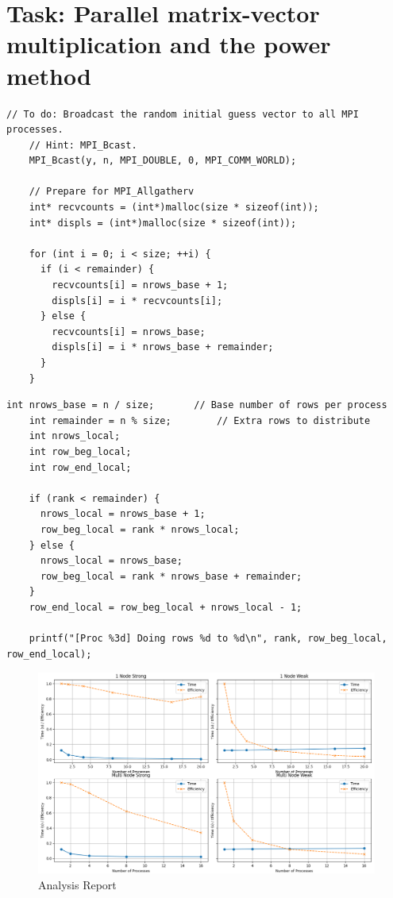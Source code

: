 \documentclass[unicode,11pt,a4paper,oneside,numbers=endperiod,openany]{scrartcl}
\begin{document}
\section{Task: Parallel matrix-vector multiplication and the power method}
\begin{lstlisting}[style=mystyle, language=MyC++, caption={Broadcasting and Preparing for MPI\_Allgatherv}]
    // To do: Broadcast the random initial guess vector to all MPI processes.
    // Hint: MPI_Bcast.
    MPI_Bcast(y, n, MPI_DOUBLE, 0, MPI_COMM_WORLD);
  
    // Prepare for MPI_Allgatherv
    int* recvcounts = (int*)malloc(size * sizeof(int));
    int* displs = (int*)malloc(size * sizeof(int));
  
    for (int i = 0; i < size; ++i) {
      if (i < remainder) {
        recvcounts[i] = nrows_base + 1;
        displs[i] = i * recvcounts[i];
      } else {
        recvcounts[i] = nrows_base;
        displs[i] = i * nrows_base + remainder;
      }
    }
\end{lstlisting}
\newpage
\begin{lstlisting}[style=mystyle, language=MyC++, caption={Determining Local Row Ranges for MPI Processes}]
    int nrows_base = n / size;       // Base number of rows per process
    int remainder = n % size;        // Extra rows to distribute
    int nrows_local;
    int row_beg_local;
    int row_end_local;
  
    if (rank < remainder) {
      nrows_local = nrows_base + 1;
      row_beg_local = rank * nrows_local;
    } else {
      nrows_local = nrows_base;
      row_beg_local = rank * nrows_base + remainder;
    }
    row_end_local = row_beg_local + nrows_local - 1;
  
    printf("[Proc %3d] Doing rows %d to %d\n", rank, row_beg_local, row_end_local);
\end{lstlisting}
  
\begin{figure}[h]
    \centering
    \includegraphics[width=1\textwidth]{pictures/report.png}
    \caption{Analysis Report}
\end{figure}
\end{document}
